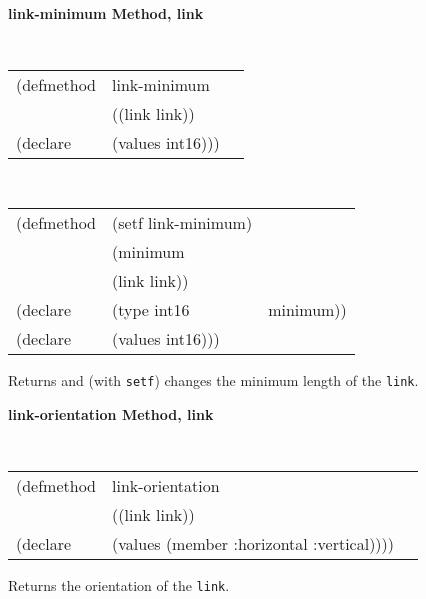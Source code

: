 {\samepage
{\large {\bf link-minimum \hfill Method, link}}
\begin{flushright} \parbox[t]{6.125in}{
\tt
\begin{tabular}{lll}
\raggedright
(defmethod & link-minimum & \\
           & ((link  link)) \\
(declare   & (values int16)))
\end{tabular}
\rm

}\end{flushright}}

{\samepage
\begin{flushright} \parbox[t]{6.125in}{
\tt
\begin{tabular}{lll}
\raggedright
(defmethod & (setf link-minimum) & \\
         & (minimum \\
         & (link link)) \\
(declare &(type int16 & minimum))\\
(declare &(values int16)))
\end{tabular}
\rm
}
\end{flushright}}



\begin{flushright} \parbox[t]{6.125in}{
Returns and (with {\tt setf}) changes the minimum length of the {\tt link}.

}\end{flushright}

{\samepage
{\large {\bf link-orientation \hfill Method, link}}
\begin{flushright} \parbox[t]{6.125in}{
\tt
\begin{tabular}{lll}
\raggedright
(defmethod & link-orientation & \\
           & ((link  link)) \\
(declare   & (values (member :horizontal :vertical))))
\end{tabular}
\rm

}\end{flushright}}

\begin{flushright} \parbox[t]{6.125in}{
Returns the orientation of the {\tt link}.

}\end{flushright}



